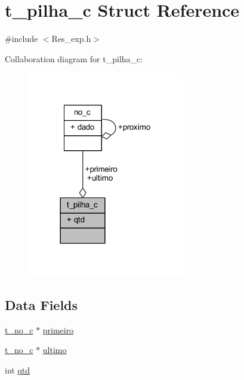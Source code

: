 \hypertarget{structt__pilha__c}{}\section{t\+\_\+pilha\+\_\+c Struct Reference}
\label{structt__pilha__c}


{\ttfamily \#include $<$Res\+\_\+exp.\+h$>$}



Collaboration diagram for t\+\_\+pilha\+\_\+c\+:
\nopagebreak
\begin{figure}[H]
\begin{center}
\leavevmode
\includegraphics[width=194pt]{structt__pilha__c__coll__graph}
\end{center}
\end{figure}
\subsection*{Data Fields}
\begin{DoxyCompactItemize}
\item 
\mbox{\hyperlink{_res__exp_8h_a49875fde21799e17a8437b9caf0ec7d0}{t\+\_\+no\+\_\+c}} $\ast$ \mbox{\hyperlink{structt__pilha__c_a78b04c824b93d6cb6ce038572bff697b}{primeiro}}
\item 
\mbox{\hyperlink{_res__exp_8h_a49875fde21799e17a8437b9caf0ec7d0}{t\+\_\+no\+\_\+c}} $\ast$ \mbox{\hyperlink{structt__pilha__c_a3bffdac0876453bd94bfcf61880645f4}{ultimo}}
\item 
int \mbox{\hyperlink{structt__pilha__c_ab64e355d6f14927f41266ddfbf88ac91}{qtd}}
\end{DoxyCompactItemize}


